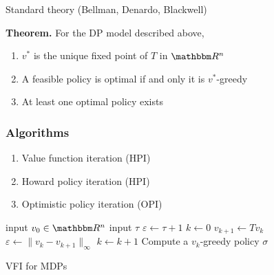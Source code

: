 \documentclass[xcolor=dvipsnames]{beamer}
\newcommand{\RR}{\mathbbm R}
\renewcommand{\epsilon}{\varepsilon}
\newcommand{\1}{\mathbbm 1}
\begin{document}
\begin{frame}\label{slide:mdp_result}

    Standard theory (Bellman, Denardo, Blackwell)

        \vspace{0.5em}
        \vspace{0.5em}
    \begin{block}{}
        {\bf Theorem.} For the DP model described above,
        \vspace{0.5em}
        \begin{enumerate}
            \item $v^*$ is the unique fixed point of $T$
                in $\RR^n$
            \vspace{0.5em}
            \vspace{0.5em}
            \item A feasible policy is optimal if and only it is
                $v^*$-greedy
            \vspace{0.5em}
            \vspace{0.5em}
            \item At least one optimal policy exists
        \end{enumerate}
    \end{block}



\end{frame}


\begin{frame}
    \frametitle{Algorithms}


    \begin{enumerate}
        \item Value function iteration (HPI)
        \vspace{0.5em}
        \item Howard policy iteration (HPI) 
        \vspace{0.5em}
        \item Optimistic policy iteration (OPI)
    \end{enumerate}


\end{frame}


\begin{frame}
    
{\small 
    \begin{algorithm}[H]
    \DontPrintSemicolon
    input $v_0 \in \RR^n$\;
    input $\tau$\;
    $\epsilon \leftarrow \tau + 1$ \;
    $k \leftarrow 0$ \;
    \While{$\epsilon > \tau $}
    {
        $v_{k+1} \leftarrow Tv_k$ \;
        $\epsilon \leftarrow \| v_k - v_{k+1} \|_\infty$ \;
        $k \leftarrow k + 1$ \;
    }
    Compute a $v_k$-greedy policy $\sigma$ \;
    \Return{$\sigma$}
    \caption{VFI for MDPs}
    \end{algorithm}
}

\end{frame}
\end{document}
